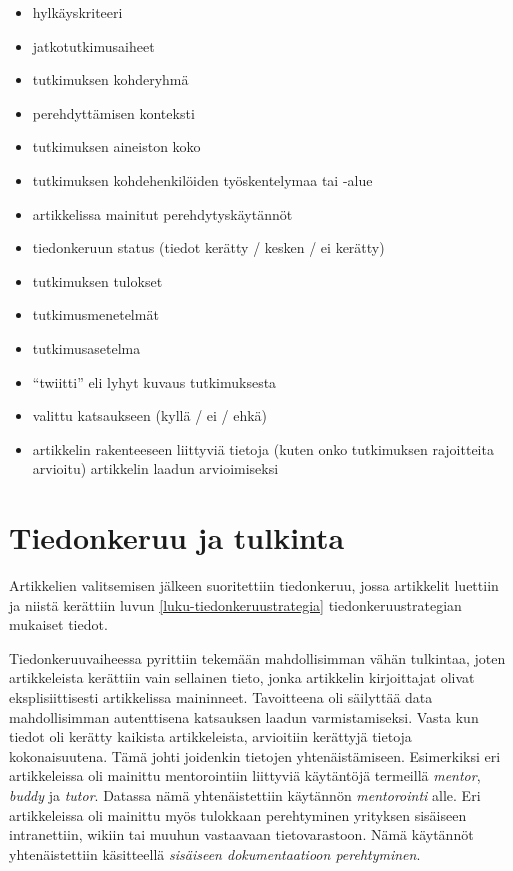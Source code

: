 \documentclass[utf8]{gradu3}
\begin{document}
\begin{itemize}
    \item hylkäyskriteeri
    \item jatkotutkimusaiheet
    \item tutkimuksen kohderyhmä
    \item perehdyttämisen konteksti
    \item tutkimuksen aineiston koko
    \item tutkimuksen kohdehenkilöiden työskentelymaa tai -alue
    \item artikkelissa mainitut perehdytyskäytännöt
    \item tiedonkeruun status (tiedot kerätty / kesken / ei kerätty)
    \item tutkimuksen tulokset
    \item tutkimusmenetelmät
    \item tutkimusasetelma
    \item ``twiitti'' eli lyhyt kuvaus tutkimuksesta
    \item valittu katsaukseen (kyllä / ei / ehkä)
    \item artikkelin rakenteeseen liittyviä tietoja (kuten onko tutkimuksen rajoitteita arvioitu) artikkelin laadun arvioimiseksi
\end{itemize}

\section{Tiedonkeruu ja tulkinta}

Artikkelien valitsemisen jälkeen suoritettiin tiedonkeruu, jossa artikkelit luettiin ja niistä kerättiin luvun \ref{luku-tiedonkeruustrategia} tiedonkeruustrategian mukaiset tiedot.

Tiedonkeruuvaiheessa pyrittiin tekemään mahdollisimman vähän tulkintaa, joten artikkeleista kerättiin vain sellainen tieto, jonka artikkelin kirjoittajat olivat eksplisiittisesti artikkelissa maininneet. Tavoitteena oli säilyttää data mahdollisimman autenttisena katsauksen laadun varmistamiseksi. Vasta kun tiedot oli kerätty kaikista artikkeleista, arvioitiin kerättyjä tietoja kokonaisuutena. Tämä johti joidenkin tietojen yhtenäistämiseen. Esimerkiksi eri artikkeleissa oli mainittu mentorointiin liittyviä käytäntöjä termeillä \textit{mentor}, \textit{buddy} ja \textit{tutor}. Datassa nämä yhtenäistettiin käytännön \textit{mentorointi} alle. Eri artikkeleissa oli mainittu myös tulokkaan perehtyminen yrityksen sisäiseen intranettiin, wikiin tai muuhun vastaavaan tietovarastoon. Nämä käytännöt yhtenäistettiin käsitteellä \textit{sisäiseen dokumentaatioon perehtyminen}.
\end{document}
